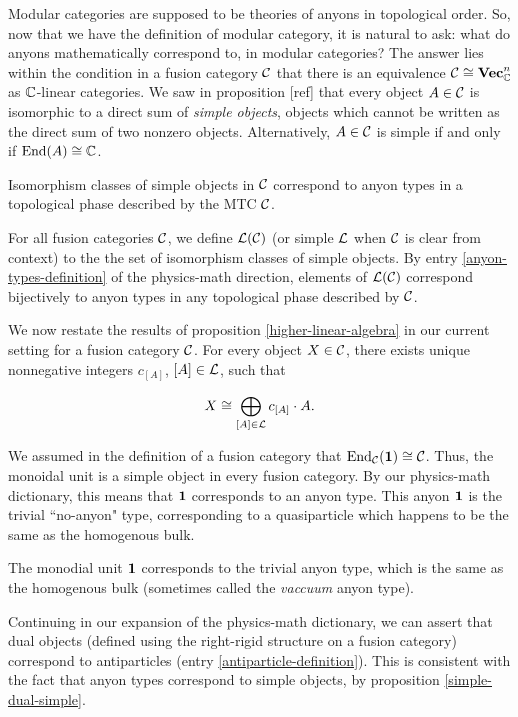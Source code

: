Modular categories are supposed to be theories of anyons in topological order. So, now that we have the definition of modular category, it is natural to ask: what do anyons mathematically correspond to, in modular categories? The answer lies within the condition in a fusion category ${\mathcal C}$ that there is an equivalence ${\mathcal C}\cong {\bf Vec}_{\mathbb C}^n$ as ${\mathbb C}$-linear categories. We saw in proposition [ref] that every object $A\in {\mathcal C}$ is isomorphic to a direct sum of {\em simple objects}, objects which cannot be written as the direct sum of two nonzero objects. Alternatively, $A\in {\mathcal C}$ is simple if and only if $\operatorname{End}(A)\cong {\mathbb C}$.

\begin{dict}\label{anyon-types-definition}
Isomorphism classes of simple objects in ${\mathcal C}$ correspond to anyon types in a topological phase described by the MTC ${\mathcal C}$.
\end{dict}

\begin{defn} For all fusion categories ${\mathcal C}$, we define ${\mathcal L}({\mathcal C})$ (or simple ${\mathcal L}$ when ${\mathcal C}$ is clear from context) to the the set of isomorphism classes of simple objects. By entry \ref{anyon-types-definition} of the physics-math direction, elements of ${\mathcal L}({\mathcal C})$ correspond bijectively to anyon types in any topological phase described by ${\mathcal C}$.
\end{defn}

We now restate the results of proposition \ref{higher-linear-algebra} in our current setting for a fusion category ${\mathcal C}$.  For every object $X\in {\mathcal C}$, there exists unique nonnegative integers $c_{[A]}$, $[A]\in {\mathcal L}$, such that

$$X\cong \bigoplus_{[A]\in {\mathcal L}}c_{[A]}\cdot A.$$

We assumed in the definition of a fusion category that $\operatorname{End}_{\mathcal C}({\mathbf 1})\cong {\mathcal C}$. Thus, the monoidal unit is a simple object in every fusion category. By our physics-math dictionary, this means that ${\mathbf 1}$ corresponds to an anyon type. This anyon ${\mathbf 1}$ is the trivial ``no-anyon" type, corresponding to a quasiparticle which happens to be the same as the homogenous bulk.

\begin{dict}\label{vacuum-anyon-definition} The monodial unit ${\mathbf 1} $ corresponds to the trivial anyon type, which is the same as the homogenous bulk (sometimes called the  {\em vaccuum} anyon type).
\end{dict}

\begin{rem} Continuing in our expansion of the physics-math dictionary, we can assert that dual objects (defined using the right-rigid structure on a fusion category) correspond to antiparticles (entry \ref{antiparticle-definition}). This is consistent with the fact that anyon types correspond to simple objects, by proposition \ref{simple-dual-simple}.
\end{rem}

